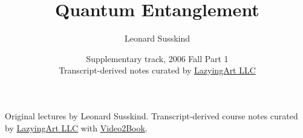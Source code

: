 \documentclass[11pt,oneside]{book}
\begin{document}
\frontmatter
\title{Quantum Entanglement}
\author{Leonard Susskind}
\date{Supplementary track, 2006 Fall Part 1 \\ Transcript-derived notes curated by \href{https://lazying.art}{LazyingArt LLC}}
\maketitle
\begin{center}
\small Original lectures by Leonard Susskind. Transcript-derived course notes curated by \href{https://lazying.art}{LazyingArt LLC} with \href{https://github.com/lachlanchen/Video2Book}{Video2Book}.
\end{center}
\clearpage
\tableofcontents
\mainmatter









\end{document}

